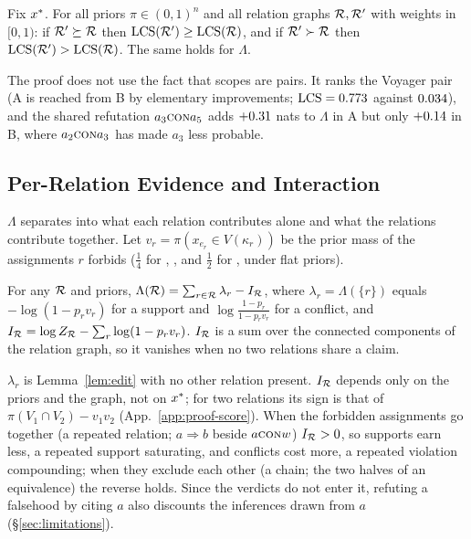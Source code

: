 \begin{theorem}[Monotonicity]
\label{thm:mono}
Fix $x^{\ast}$. For all priors $\pi\in(0,1)^n$ and all relation graphs $\mathcal{R},\mathcal{R}'$ with weights in $[0,1)$:
if $\mathcal{R}'\succeq\mathcal{R}$ then $\mathrm{LCS}(\mathcal{R}')\ge\mathrm{LCS}(\mathcal{R})$, and if $\mathcal{R}'\succ\mathcal{R}$ then $\mathrm{LCS}(\mathcal{R}')>\mathrm{LCS}(\mathcal{R})$. The
same holds for $\Lambda$.
\end{theorem}

The proof does not use the fact that scopes are pairs. It ranks the Voyager pair (A is reached from B
by elementary improvements; $\mathrm{LCS}=0.773$ against $0.034$), and the shared refutation $a_3\textsc{con} a_5$
adds $+0.31$ nats to $\Lambda$ in A but only $+0.14$ in B, where $a_2\textsc{con} a_3$ has made $a_3$
less probable.

\subsection{Per-Relation Evidence and Interaction}
\label{sec:decomp}

$\Lambda$ separates into what each relation contributes alone and what the relations contribute
together. Let $v_r=\pi(x_{e_r}\in V(\kappa_r))$ be the prior mass of the assignments $r$ forbids
($\frac14$ for \ent, \con, \cnc{} and $\frac12$ for \eqv, \exc{} under flat priors).

\begin{proposition}[Decomposition]
\label{prop:decomp}
For any $\mathcal{R}$ and priors, $\Lambda(\mathcal{R})=\sum_{r\in\mathcal{R}}\lambda_r-I_{\mathcal{R}}$, where $\lambda_r=\Lambda(\{r\})$
equals $-\log(1-p_rv_r)$ for a support and $\log\frac{1-p_r}{1-p_rv_r}$ for a conflict, and
$I_{\mathcal{R}}=\log Z_{\mathcal{R}}-\sum_r\log(1-p_rv_r)$. $I_{\mathcal{R}}$ is a sum over the connected components of the
relation graph, so it vanishes when no two relations share a claim.
\end{proposition}

$\lambda_r$ is Lemma~\ref{lem:edit} with no other relation present. $I_{\mathcal{R}}$ depends only on the priors
and the graph, not on $x^{\ast}$; for two relations its sign is that of $\pi(V_1\cap V_2)-v_1v_2$
(App.~\ref{app:proof-score}). When the forbidden assignments go together (a repeated relation;
$a\Rightarrow b$ beside $a\textsc{con} w$) $I_{\mathcal{R}}>0$, so supports earn less, a repeated support saturating, and
conflicts cost more, a repeated violation compounding; when they exclude each other (a chain; the two
halves of an equivalence) the reverse holds. Since the verdicts do not enter it, refuting a
falsehood by citing $a$ also discounts the inferences drawn from $a$ (\S\ref{sec:limitations}).

